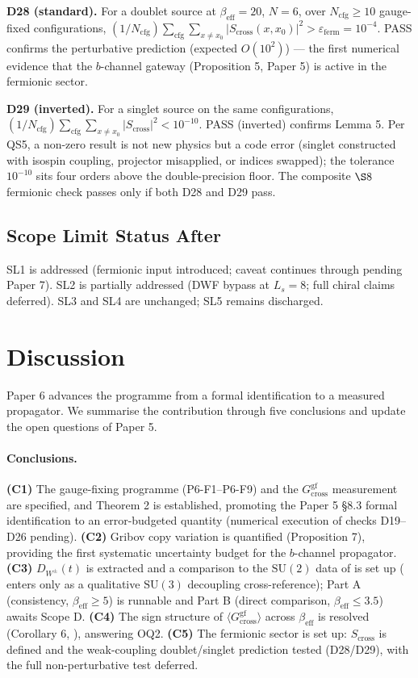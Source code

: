 \documentclass[11pt,a4paper]{article}
\theoremstyle{plain}
\theoremstyle{definition}
\theoremstyle{remark}
\newcommand{\SU}{\mathrm{SU}}
\newcommand{\Gcrossgf}{G_{\mathrm{cross}}^{\mathrm{gf}}}
\newcommand{\DW}{D_{W^{\pm}}}
\newcommand{\Scross}{S_{\mathrm{cross}}}
\newcommand{\be}{\beta_{\mathrm{eff}}}
\newcommand{\Ncfg}{N_{\mathrm{cfg}}}
\begin{document}
\textbf{D28 (standard).} For a doublet source at $\be=20$, $N=6$, over
$\Ncfg\ge10$ gauge-fixed configurations,
$(1/\Ncfg)\sum_{\mathrm{cfg}}\sum_{x\ne x_0}|\Scross(x,x_0)|^2
>\varepsilon_{\mathrm{ferm}}=10^{-4}$. PASS confirms the perturbative
prediction (expected $O(10^2)$) --- the first numerical evidence that the
$b$-channel gateway (Proposition 5, Paper 5) is active in the fermionic
sector.

\textbf{D29 (inverted).} For a singlet source on the same configurations,
$(1/\Ncfg)\sum_{\mathrm{cfg}}\sum_{x\ne x_0}|\Scross|^2<10^{-10}$. PASS
(inverted) confirms Lemma 5. Per QS5, a non-zero result is not new
physics but a code error (singlet constructed with isospin coupling,
projector misapplied, or indices swapped); the tolerance $10^{-10}$ sits
four orders above the double-precision floor. The composite $\S8$
fermionic check passes only if both D28 and D29 pass.

\subsection{Scope Limit Status After \texorpdfstring{}{Section 8}}
\label{ssec:scopestatus}

SL1 is addressed (fermionic input introduced; caveat continues through
 pending Paper 7). SL2 is partially
addressed (DWF bypass at $L_s=8$; full chiral claims deferred). SL3 and
SL4 are unchanged; SL5 remains discharged.

\section{Discussion}
\label{sec:discussion}

Paper 6 advances the programme from a formal identification to a measured
propagator. We summarise the contribution through five conclusions and
update the open questions of Paper 5.

\paragraph{Conclusions.}
\textbf{(C1)} The gauge-fixing programme (P6-F1--P6-F9) and the
$\Gcrossgf$ measurement are specified, and Theorem 2 is established,
promoting the Paper 5 \S8.3 formal identification to an error-budgeted
quantity (numerical execution of checks D19--D26 pending).
\textbf{(C2)} Gribov copy variation is quantified (Proposition 7),
providing the first systematic uncertainty budget for the $b$-channel
propagator. \textbf{(C3)} $\DW(t)$ is extracted and a comparison to the $\SU(2)$
data of \cite{CM} is set up (\cite{Bo} enters only as a qualitative
$\SU(3)$ decoupling cross-reference); Part A (consistency, $\be\ge5$) is runnable and
Part B (direct comparison, $\be\le3.5$) awaits Scope D. \textbf{(C4)} The
sign structure of $\langle\Gcrossgf\rangle$ across $\be$ is resolved
(Corollary 6, ), answering OQ2. \textbf{(C5)} The
fermionic sector is set up: $\Scross$ is defined and the weak-coupling
doublet/singlet prediction tested (D28/D29), with the full
non-perturbative test deferred.
\end{document}
